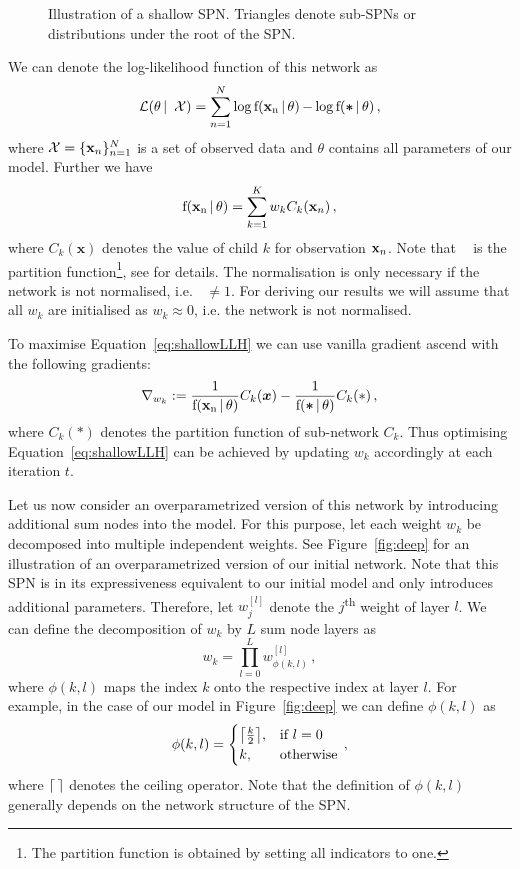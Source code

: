 \documentclass{article}
\DeclarePairedDelimiter\ceil{\lceil}{\rceil}
\DeclareMathOperator*{\f}{f(\xn \,|\, \theta)}
\DeclareMathOperator*{\fz}{f(\bm \ast \,|\, \theta)}
\begin{document}
\begin{figure}[t]
  \centering
  
  \caption{Illustration of a shallow SPN. Triangles denote sub-SPNs or distributions under the root of the SPN.}
  \label{fig:shallow}
\end{figure}

We can denote the log-likelihood function of this network as
\begin{equation} \label{eq:shallowLLH}
\mathcal{L}(\theta\, | \, \mathcal{X}) = \sum_{n=1}^N \log \f - \log \fz \, ,
\end{equation}
where $\mathcal{X} = \{\mathbf{x}_{n}\}_{n=1}^N$ is a set of observed data and $\theta$ contains all parameters of our model. Further we have
\[
\f = \sum_{k=1}^K w_k C_k(\xn) \, ,
\]
where $C_k(\bm x)$ denotes the value of child $k$ for observation $\mathbf{x}_{n}$.
Note that $\fz$ is the partition function\footnote{The partition function is obtained by setting all indicators to one.}, see \cite{Poon2011a} for details. The normalisation is only necessary if the network is not normalised, i.e.  $\fz \not = 1$.
For deriving our results we will assume that all $w_k$ are initialised as $w_k \approx 0$, i.e. the network is not normalised.

To maximise Equation~\ref{eq:shallowLLH} we can use vanilla gradient ascend with the following gradients:
\begin{equation}
  \nabla_{w_k} := \frac{1}{\f}C_k(\bm x) - \frac{1}{\fz}C_k(\ast) \, ,
\end{equation}
where $C_k(\ast)$ denotes the partition function of sub-network $C_k$.
Thus optimising Equation~\ref{eq:shallowLLH} can be achieved by updating $w_k$ accordingly at each iteration $t$.

Let us now consider an overparametrized version of this network by introducing additional sum nodes into the model.
For this purpose, let each weight $w_k$ be decomposed into multiple independent weights.
See Figure~\ref{fig:deep} for an illustration of an overparametrized version of our initial network.
Note that this SPN is in its expressiveness equivalent to our initial model and only introduces additional parameters.
Therefore, let $w^{[l]}_{j}$ denote the $j$\textsuperscript{th} weight of layer $l$.
We can define the decomposition of $w_k$ by $L$ sum node layers as
\begin{equation} \label{eq:decomposition}
w_k = \prod_{l=0}^L w^{[l]}_{\phi(k, l)} \, ,
\end{equation}
where $\phi(k, l)$ maps the index $k$ onto the respective index at layer $l$.
For example, in the case of our model in Figure~\ref{fig:deep} we can define $\phi(k, l)$ as
\[
    \phi(k, l) =
\begin{cases}
    \ceil*{\frac{k}{2}} ,& \text{if } l = 0\\
    k, & \text{otherwise}
\end{cases} \, ,
\]
where $\ceil*{\,}$ denotes the ceiling operator.
Note that the definition of $\phi(k, l)$ generally depends on the network structure of the SPN.
\end{document}
